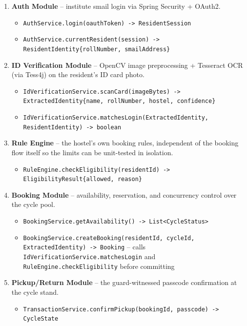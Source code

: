 \documentclass[11pt]{article}
\begin{document}
\begin{enumerate}[leftmargin=*]
  \item \textbf{Auth Module} -- institute smail login via Spring Security + OAuth2.
  \begin{itemize}[leftmargin=*]
    \item \texttt{AuthService.login(oauthToken) -> ResidentSession}
    \item \texttt{AuthService.currentResident(session) -> ResidentIdentity\{rollNumber, smailAddress\}}
  \end{itemize}
  \item \textbf{ID Verification Module} -- OpenCV image preprocessing + Tesseract OCR (via Tess4j) on the resident's ID card photo.
  \begin{itemize}[leftmargin=*]
    \item \texttt{IdVerificationService.scanCard(imageBytes) -> ExtractedIdentity\{name, rollNumber, hostel, confidence\}}
    \item \texttt{IdVerificationService.matchesLogin(ExtractedIdentity, ResidentIdentity) -> boolean}
  \end{itemize}
  \item \textbf{Rule Engine} -- the hostel's own booking rules, independent of the booking flow itself so the limits can be unit-tested in isolation.
  \begin{itemize}[leftmargin=*]
    \item \texttt{RuleEngine.checkEligibility(residentId) -> EligibilityResult\{allowed, reason\}}
  \end{itemize}
  \item \textbf{Booking Module} -- availability, reservation, and concurrency control over the cycle pool.
  \begin{itemize}[leftmargin=*]
    \item \texttt{BookingService.getAvailability() -> List<CycleStatus>}
    \item \texttt{BookingService.createBooking(residentId, cycleId, ExtractedIdentity) -> Booking} -- calls \texttt{IdVerificationService.matchesLogin} and \texttt{RuleEngine.checkEligibility} before committing
  \end{itemize}
  \item \textbf{Pickup/Return Module} -- the guard-witnessed passcode confirmation at the cycle stand.
  \begin{itemize}[leftmargin=*]
    \item \texttt{TransactionService.confirmPickup(bookingId, passcode) -> CycleState}

\end{itemize}
\end{enumerate}
\end{document}
